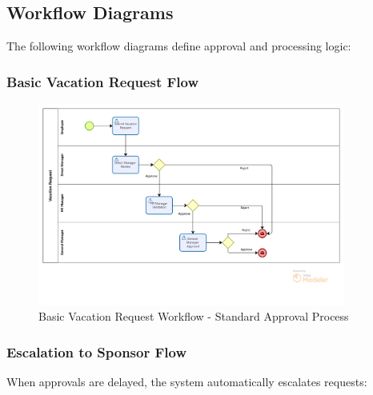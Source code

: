 \documentclass[12pt,a4paper]{article}
\begin{document}
\subsection{Workflow Diagrams}
The following workflow diagrams define approval and processing logic:

\subsubsection{Basic Vacation Request Flow}

\begin{figure}[H]
\centering
\includegraphics[width=0.9\textwidth]{Diagrams/Workflows/Vacation-Request-Basic-Flow/Vacation-Request-Basic-Flow.png}
\caption{Basic Vacation Request Workflow - Standard Approval Process}
\label{fig:basic-flow-app}
\end{figure}



\subsubsection{Escalation to Sponsor Flow}
When approvals are delayed, the system automatically escalates requests:
\end{document}
